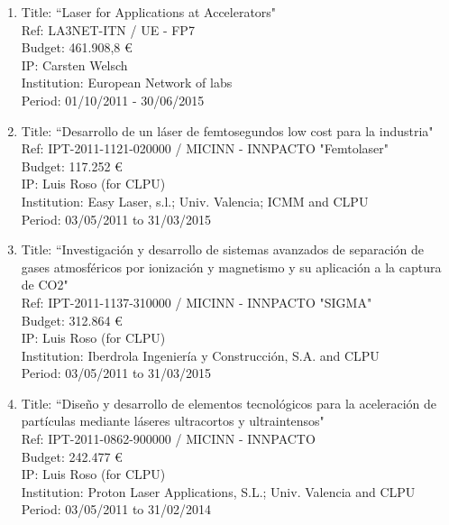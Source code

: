 \begin{enumerate}

\item Title: ``Laser for Applications at Accelerators"\\
Ref:   LA3NET-ITN     / UE - FP7 \\
Budget:  461.908,8 \euro \\
IP:  Carsten Welsch \\
Institution:  European Network of labs \\
Period:   01/10/2011 - 30/06/2015 \\


\item Title: ``Desarrollo de un l\'aser de femtosegundos low cost para la industria"\\
Ref:  IPT-2011-1121-020000     / MICINN - INNPACTO "Femtolaser" \\
Budget: 117.252 \euro \\
IP:  Luis Roso (for CLPU) \\
Institution:  Easy Laser, s.l.; Univ. Valencia; ICMM and CLPU \\
Period:  03/05/2011 to 31/03/2015 \\

\item Title: ``Investigaci\'on y desarrollo de sistemas avanzados de separaci\'on de gases atmosf\'ericos por ionizaci\'on y magnetismo y su aplicaci\'on a la captura de CO2"\\
Ref:   IPT-2011-1137-310000     / MICINN - INNPACTO "SIGMA" \\
Budget:  312.864 \euro \\
IP:  Luis Roso (for CLPU) \\
Institution:  Iberdrola Ingenier\'ia y Construcci\'on, S.A. and CLPU \\
Period: 03/05/2011 to 31/03/2015 \\

\item Title: ``Dise\~no y desarrollo de elementos tecnol\'ogicos para la aceleraci\'on de part\'iculas mediante l\'aseres ultracortos y ultraintensos"\\
Ref:  IPT-2011-0862-900000     / MICINN - INNPACTO \\
Budget: 242.477 \euro \\
IP:  Luis Roso (for CLPU) \\
Institution:  Proton Laser Applications, S.L.; Univ. Valencia and CLPU \\
Period:   03/05/2011 to 31/02/2014 \\


\end{enumerate}
